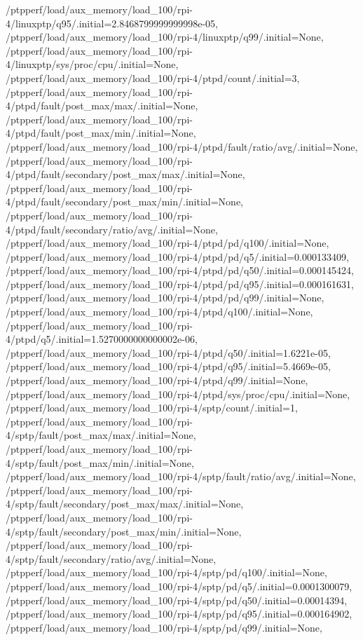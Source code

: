 {    /ptpperf/load/aux_memory/load_100/rpi-4/linuxptp/q95/.initial=2.8468799999999998e-05,
    /ptpperf/load/aux_memory/load_100/rpi-4/linuxptp/q99/.initial=None,
    /ptpperf/load/aux_memory/load_100/rpi-4/linuxptp/sys/proc/cpu/.initial=None,
    /ptpperf/load/aux_memory/load_100/rpi-4/ptpd/count/.initial=3,
    /ptpperf/load/aux_memory/load_100/rpi-4/ptpd/fault/post_max/max/.initial=None,
    /ptpperf/load/aux_memory/load_100/rpi-4/ptpd/fault/post_max/min/.initial=None,
    /ptpperf/load/aux_memory/load_100/rpi-4/ptpd/fault/ratio/avg/.initial=None,
    /ptpperf/load/aux_memory/load_100/rpi-4/ptpd/fault/secondary/post_max/max/.initial=None,
    /ptpperf/load/aux_memory/load_100/rpi-4/ptpd/fault/secondary/post_max/min/.initial=None,
    /ptpperf/load/aux_memory/load_100/rpi-4/ptpd/fault/secondary/ratio/avg/.initial=None,
    /ptpperf/load/aux_memory/load_100/rpi-4/ptpd/pd/q100/.initial=None,
    /ptpperf/load/aux_memory/load_100/rpi-4/ptpd/pd/q5/.initial=0.000133409,
    /ptpperf/load/aux_memory/load_100/rpi-4/ptpd/pd/q50/.initial=0.000145424,
    /ptpperf/load/aux_memory/load_100/rpi-4/ptpd/pd/q95/.initial=0.000161631,
    /ptpperf/load/aux_memory/load_100/rpi-4/ptpd/pd/q99/.initial=None,
    /ptpperf/load/aux_memory/load_100/rpi-4/ptpd/q100/.initial=None,
    /ptpperf/load/aux_memory/load_100/rpi-4/ptpd/q5/.initial=1.5270000000000002e-06,
    /ptpperf/load/aux_memory/load_100/rpi-4/ptpd/q50/.initial=1.6221e-05,
    /ptpperf/load/aux_memory/load_100/rpi-4/ptpd/q95/.initial=5.4669e-05,
    /ptpperf/load/aux_memory/load_100/rpi-4/ptpd/q99/.initial=None,
    /ptpperf/load/aux_memory/load_100/rpi-4/ptpd/sys/proc/cpu/.initial=None,
    /ptpperf/load/aux_memory/load_100/rpi-4/sptp/count/.initial=1,
    /ptpperf/load/aux_memory/load_100/rpi-4/sptp/fault/post_max/max/.initial=None,
    /ptpperf/load/aux_memory/load_100/rpi-4/sptp/fault/post_max/min/.initial=None,
    /ptpperf/load/aux_memory/load_100/rpi-4/sptp/fault/ratio/avg/.initial=None,
    /ptpperf/load/aux_memory/load_100/rpi-4/sptp/fault/secondary/post_max/max/.initial=None,
    /ptpperf/load/aux_memory/load_100/rpi-4/sptp/fault/secondary/post_max/min/.initial=None,
    /ptpperf/load/aux_memory/load_100/rpi-4/sptp/fault/secondary/ratio/avg/.initial=None,
    /ptpperf/load/aux_memory/load_100/rpi-4/sptp/pd/q100/.initial=None,
    /ptpperf/load/aux_memory/load_100/rpi-4/sptp/pd/q5/.initial=0.0001300079,
    /ptpperf/load/aux_memory/load_100/rpi-4/sptp/pd/q50/.initial=0.00014394,
    /ptpperf/load/aux_memory/load_100/rpi-4/sptp/pd/q95/.initial=0.000164902,
    /ptpperf/load/aux_memory/load_100/rpi-4/sptp/pd/q99/.initial=None,
}
